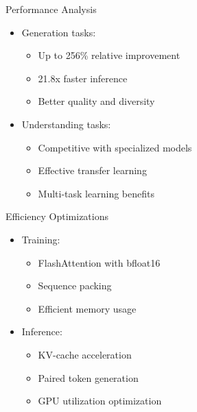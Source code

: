 \begin{frame}{Performance Analysis}
    \begin{itemize}
        \item Generation tasks:
        \begin{itemize}
            \item Up to 256\% relative improvement
            \item 21.8x faster inference
            \item Better quality and diversity
        \end{itemize}
        \item Understanding tasks:
        \begin{itemize}
            \item Competitive with specialized models
            \item Effective transfer learning
            \item Multi-task learning benefits
        \end{itemize}
    \end{itemize}
\end{frame}

\begin{frame}{Efficiency Optimizations}
    \begin{itemize}
        \item Training:
        \begin{itemize}
            \item FlashAttention with bfloat16
            \item Sequence packing
            \item Efficient memory usage
        \end{itemize}
        \item Inference:
        \begin{itemize}
            \item KV-cache acceleration
            \item Paired token generation
            \item GPU utilization optimization
        \end{itemize}
    \end{itemize}
\end{frame}

